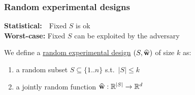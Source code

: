 \documentclass{beamer}
\begin{document}
\begin{frame}
  \frametitle{Random experimental designs}
  \textbf{Statistical:}  \ \,Fixed $S$ is ok\\
  \textbf{Worst-case:} Fixed $S$ can be exploited by the
  adversary\pause
  \vspace{5mm}
  
\begin{definition}
We define a \underline{random experimental design} $(S,\widehat{\mathbf w})$
of size $k$ as:
  \begin{enumerate}
    \item a random subset $S\subseteq \{1..n\}$ s.t.~$|S|\leq k$
    \item a jointly random function $\widehat{\mathbf w}:\mathbb R^{|S|}\rightarrow\mathbb R^d$
    \end{enumerate}
    \end{definition}
    \vspace{6mm}
    
\end{frame}
\end{document}
